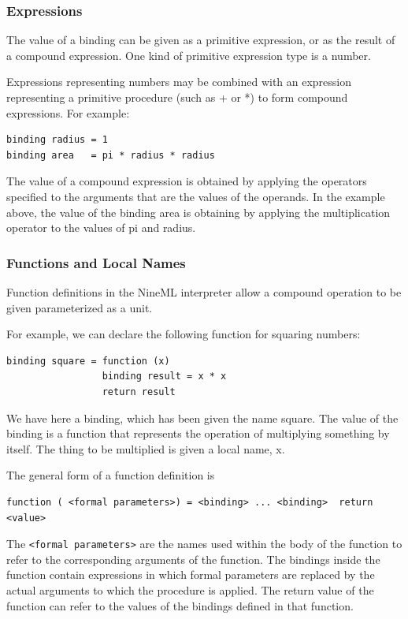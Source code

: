 \documentclass[a4paper]{article}
\begin{document}
 
\subsubsection{Expressions}

The value of a binding can be given as a primitive expression, or as
the result of a compound expression. One kind of primitive expression
type is a number.

Expressions representing numbers may be combined with an expression
representing a primitive procedure (such as + or *) to form compound
expressions. For example:

\begin{lstlisting}[style=display]
binding radius = 1
binding area   = pi * radius * radius
\end{lstlisting}

The value of a compound expression is obtained by applying the
operators specified to the arguments that are the values of the
operands. In the example above, the value of the binding area is
obtaining by applying the multiplication operator to the values of pi
and radius.

\subsubsection{Functions and Local Names}

Function definitions in the NineML interpreter allow a compound operation to be given
parameterized as a unit.

For example, we can declare the following function for squaring
numbers:

\begin{lstlisting}[style=display]
binding square = function (x)
                 binding result = x * x
                 return result
\end{lstlisting}

We have here a binding, which has been given the name square. The
value of the binding is a function that represents the operation of
multiplying something by itself. The thing to be multiplied is given a
local name, x.

The general form of a function definition is

\begin{lstlisting}[style=display]
function ( <formal parameters>) = <binding> ... <binding>  return <value>
\end{lstlisting}
 
The \verb^<formal parameters>^ are the names used within the body of the
function to refer to the corresponding arguments of the function. The
bindings inside the function contain expressions in which formal
parameters are replaced by the actual arguments to which the procedure
is applied. The return value of the function can refer to the values
of the bindings defined in that function.
\end{document}
